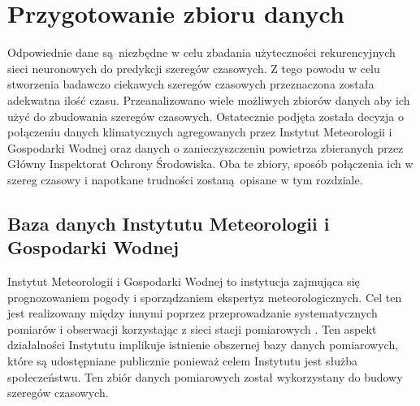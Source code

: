 \documentclass[10pt,a4paper]{article}
\begin{document}
\newpage
\section{Przygotowanie zbioru danych}
Odpowiednie dane są niezbędne w celu zbadania użyteczności rekurencyjnych sieci neuronowych do predykcji szeregów czasowych. Z tego powodu w celu stworzenia badawczo ciekawych szeregów czasowych przeznaczona została adekwatna ilość czasu. Przeanalizowano wiele możliwych zbiorów danych aby ich użyć do zbudowania szeregów czasowych. Ostatecznie podjęta została decyzja o połączeniu danych klimatycznych agregowanych przez Instytut Meteorologii i Gospodarki Wodnej oraz danych o zanieczyszczeniu powietrza zbieranych przez Główny Inspektorat Ochrony Środowiska. Oba te zbiory, sposób połączenia ich w szereg czasowy i napotkane trudności zostaną opisane w tym rozdziale. 

\subsection{Baza danych Instytutu Meteorologii i Gospodarki Wodnej}
Instytut Meteorologii i Gospodarki Wodnej to instytucja zajmująca się prognozowaniem pogody i sporządzaniem ekspertyz meteorologicznych. Cel ten jest realizowany między innymi poprzez przeprowadzanie systematycznych pomiarów i obserwacji korzystając z sieci stacji pomiarowych \cite{imgwTask}. Ten aspekt działalności Instytutu implikuje istnienie obszernej bazy danych pomiarowych, które są udostępniane publicznie ponieważ celem Instytutu jest służba społeczeństwu. Ten zbiór danych pomiarowych został wykorzystany do budowy szeregów czasowych. 
\end{document}
